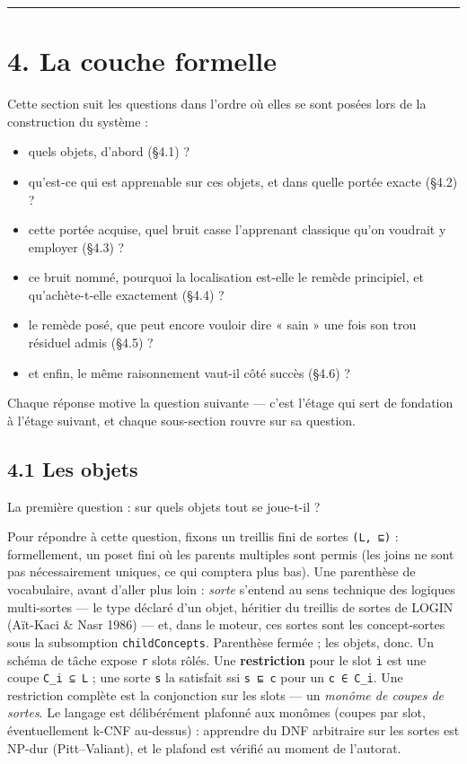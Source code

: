 \documentclass[11pt]{article}
\begin{document}
\medskip\hrule\medskip

\section*{4. La couche formelle}

Cette section suit les questions dans l'ordre où elles se sont posées lors de la construction du système :

\begin{itemize}
\item quels objets, d'abord (§4.1) ?
\item qu'est-ce qui est apprenable sur ces objets, et dans quelle portée exacte (§4.2) ?
\item cette portée acquise, quel bruit casse l'apprenant classique qu'on voudrait y employer (§4.3) ?
\item ce bruit nommé, pourquoi la localisation est-elle le remède principiel, et qu'achète-t-elle exactement (§4.4) ?
\item le remède posé, que peut encore vouloir dire « sain » une fois son trou résiduel admis (§4.5) ?
\item et enfin, le même raisonnement vaut-il côté succès (§4.6) ?
\end{itemize}

Chaque réponse motive la question suivante — c'est l'étage qui sert de fondation à l'étage suivant, et chaque sous-section rouvre sur sa question.

\subsection*{4.1 Les objets}

La première question : sur quels objets tout se joue-t-il ?

Pour répondre à cette question, fixons un treillis fini de sortes \texttt{(L, ⊑)} : formellement, un poset fini où les parents multiples sont permis (les joins ne sont pas nécessairement uniques, ce qui comptera plus bas). Une parenthèse de vocabulaire, avant d'aller plus loin : \emph{sorte} s'entend au sens technique des logiques multi-sortes — le type déclaré d'un objet, héritier du treillis de sortes de LOGIN (Aït-Kaci \& Nasr 1986) — et, dans le moteur, ces sortes sont les concept-sortes sous la subsomption \texttt{childConcepts}. Parenthèse fermée ; les objets, donc. Un schéma de tâche expose \texttt{r} slots rôlés. Une \textbf{restriction} pour le slot \texttt{i} est une coupe \texttt{C\_i ⊆ L} ; une sorte \texttt{s} la satisfait ssi \texttt{s ⊑ c} pour un \texttt{c ∈ C\_i}. Une restriction complète est la conjonction sur les slots — un \emph{monôme de coupes de sortes}. Le langage est délibérément plafonné aux monômes (coupes par slot, éventuellement k-CNF au-dessus) : apprendre du DNF arbitraire sur les sortes est NP-dur (Pitt–Valiant), et le plafond est vérifié au moment de l'autorat.
\end{document}
